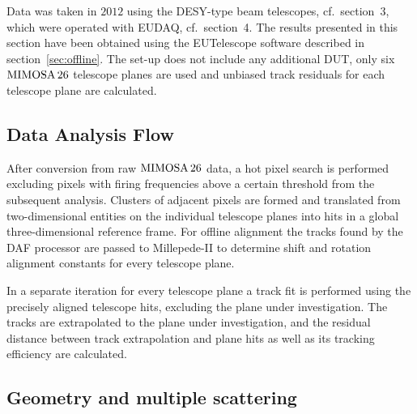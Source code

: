 Data was taken in $2012$ using the DESY-type beam telescopes, cf.~section~3, which were operated with EUDAQ, cf.~section~4. 
The results presented in this section have been obtained using the EUTelescope software described in section~\ref{sec:offline}.
The set-up does not include any additional DUT, only six $\textrm{MIMOSA\,26}$ telescope planes are used and unbiased track residuals for each telescope plane are calculated.

\subsection{Data Analysis Flow}
\label{sec:datura-nodut}

After conversion from raw $\textrm{MIMOSA\,26}$ data, a hot pixel search is performed excluding pixels with firing frequencies above a certain threshold from the subsequent analysis.
Clusters of adjacent pixels are formed and translated from two-dimensional entities on the individual telescope planes into hits in a global three-dimensional reference frame.
For offline alignment the tracks found by the DAF processor are passed to Millepede-II to determine shift and rotation alignment constants for every telescope plane.

In a separate iteration for every telescope plane a track fit is performed using the precisely aligned telescope hits, excluding the plane under investigation.
The tracks are extrapolated to the plane under investigation, and the residual distance between track extrapolation and plane hits as well as its tracking efficiency are calculated.

\subsection{Geometry and multiple scattering}
\label{sec:multiplescattering}

